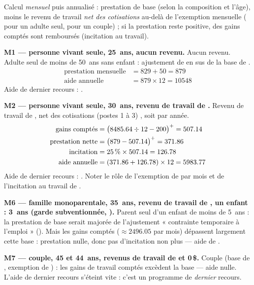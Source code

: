 \pexemples Calcul \emph{mensuel} puis annualisé : prestation de base (selon la
composition et l'âge), moins le revenu de travail \emph{net des cotisations}
au-delà de l'exemption mensuelle ( pour un adulte seul,
 pour un couple) ; si la prestation reste positive,
 des gains comptés sont remboursés (incitation au
travail).

\medskip\noindent\textbf{M1 --- personne vivant seule, 25~ans, aucun revenu.}
Aucun revenu. Adulte seul de moins de 50~ans sans enfant : ajustement
de  en sus de la base de .
\begin{align*}
\text{prestation mensuelle} &= \num{829} + \num{50} = \num{879} \\
\text{aide annuelle} &= \num{879} \times 12 = \num{10548}
\end{align*}
Aide de dernier recours : .

\medskip\noindent\textbf{M2 --- personne vivant seule, 30~ans, revenu de travail de .}
Revenu de travail de , net des cotisations (postes 1 à 3)
, soit  par année.
\begin{align*}
\text{gains comptés} &= \bigl(\num{8485.64} \div 12 - \num{200}\bigr)^{+} = \num{507.14} \\
\text{prestation nette} &= \bigl(\num{879} - \num{507.14}\bigr)^{+} = \num{371.86} \\
\text{incitation} &= \num{25}\,\% \times \num{507.14} = \num{126.78} \\
\text{aide annuelle} &= (\num{371.86} + \num{126.78}) \times 12 = \num{5983.77}
\end{align*}
Aide de dernier recours : . Noter le rôle de l'exemption de
 par mois et de l'incitation au travail de
.

\medskip\noindent\textbf{M6 --- famille monoparentale, 35~ans, revenu de travail de , un enfant : 3~ans (garde subventionnée, ).}
Parent seul d'un enfant de moins de 5~ans : la prestation de base
serait majorée de l'ajustement « contrainte temporaire à l'emploi »
(). Mais les gains comptés
($\approx \num{2496.05}$
par mois) dépassent largement cette base : prestation nulle, donc pas
d'incitation non plus — aide de .

\medskip\noindent\textbf{M7 --- couple, 45 et 44~ans, revenus de travail de  et 0\,\$.}
Couple (base de , exemption de ) :
les gains de travail comptés excèdent la base — aide nulle. L'aide de dernier
recours s'éteint vite : c'est un programme de \emph{dernier} recours.
